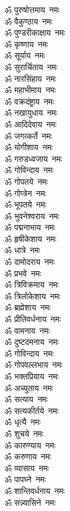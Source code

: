 \begin{multicols}{2}
\begin{flushleft}
ॐ पुरुषोत्तमाय~नमः\\
ॐ वैकुण्ठाय~नमः\\
ॐ पुण्डरीकाक्षाय~नमः\\
ॐ कृष्णाय~नमः\hfill{}\\
ॐ सूर्याय~नमः\\
ॐ सुरार्चिताय~नमः\\
ॐ नारसिंहाय~नमः\\
ॐ महाभीमाय~नमः\\
ॐ वक्रदंष्ट्राय~नमः\\
ॐ नखायुधाय~नमः\\
ॐ आदिदेवाय~नमः\\
ॐ जगत्कर्ते~नमः\\
ॐ योगीशाय~नमः\\
ॐ गरुडध्वजाय~नमः\hfill{}\\
ॐ गोविन्दाय~नमः\\
ॐ गोपतये~नमः\\
ॐ गोप्त्रेन~नमः\\
ॐ भूपतये~नमः\\
ॐ भुवनेश्वराय~नमः\\
ॐ पद्मनाभाय~नमः\\
ॐ हृषीकेशाय~नमः\\
ॐ धात्रे~नमः\\
ॐ दामोदराय~नमः\\
ॐ प्रभवे~नमः\hfill{}\\
ॐ त्रिविक्रमाय~नमः\\
ॐ त्रिलोकेशाय~नमः\\
ॐ ब्रह्मेशाय~नमः\\
ॐ प्रीतिवर्धनाय~नमः\\
ॐ वामनाय~नमः\\
ॐ दुष्टदमनाय~नमः\\
ॐ गोविन्दाय~नमः\\
ॐ गोपवल्लभाय~नमः\\
ॐ भक्तप्रियाय~नमः\\
ॐ अच्युताय~नमः\hfill{}\\
ॐ सत्याय~नमः\\
ॐ सत्यकीर्तये~नमः\\
ॐ धृत्यै~नमः\\
ॐ शुचये~नमः\\
ॐ कारुण्याय~नमः\\
ॐ करुणाय~नमः\\
ॐ व्यासाय~नमः\\
ॐ पापघ्ने~नमः\\
ॐ शान्तिवर्धनाय~नमः\\
ॐ सन्न्यासिने~नमः\hfill{}\\

\end{flushleft}
\end{multicols}
